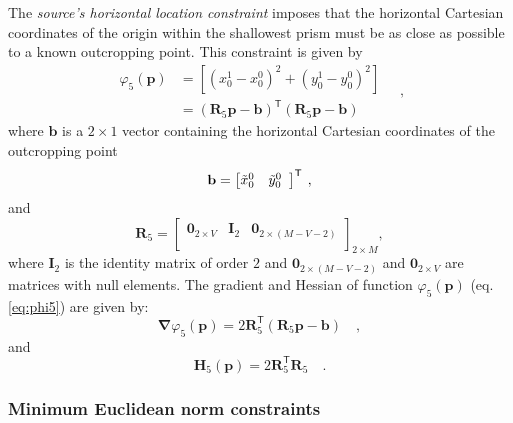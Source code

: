 The \textit{source's horizontal location constraint} imposes that the horizontal Cartesian coordinates of the origin within 
the shallowest prism must be as close as possible to a known outcropping point. This constraint is given by
\begin{equation}\label{eq:phi5}
\begin{split}
\varphi_{5}(\mathbf{p}) &= \left[\left(x_{0}^{1} - x_{0}^{0}\right)^2 + \left(y_{0}^{1} - y_0^0\right)^2\right] \\
&= \left(\mathbf{R}_{5} \mathbf{p} - \mathbf{b} \right)^{\mathsf{T}}
\left(\mathbf{R}_{5} \mathbf{p} - \mathbf{b}\right)
\end{split} \quad ,
\end{equation}
where $\mathbf{b}$ is a $2 \times 1$ vector containing the horizontal Cartesian coordinates of the outcropping point 
\begin{equation}
\mathbf{b} = \left[ \begin{array}{@{}*{12}{c}@{}}
\tilde{x}_{0}^{0} & \tilde{y}_{0}^{0} \\
\end{array} \right]^{\mathsf{T}} \: ,
\label{eq:b-vector}
\end{equation}
and
\begin{equation}
\mathbf{R}_{5} = 
\begin{bmatrix}
\mathbf{0}_{2 \times V} & \mathbf{I}_{2} & \mathbf{0}_{2 \times (M-V-2)} \\
\end{bmatrix}_{2 \times M},
\label{eq:R5-matrix}
\end{equation}
where $\mathbf{I}_{2}$ is the identity matrix of order $2$ and $\mathbf{0}_{2 \times (M-V-2)}$ and 
$\mathbf{0}_{2 \times V}$ are matrices with null elements. The gradient and Hessian of function $\varphi_{5}(\mathbf{p})$ (eq. \ref{eq:phi5}) are given by:
\begin{equation}\label{eq:phi5_grad}
\boldsymbol{\nabla}\varphi_{5}(\mathbf{p}) = 2\mathbf{R}_{5}^{\mathsf{T}}
\left(\mathbf{R}_{5} \mathbf{p} - \mathbf{b}\right) \quad ,
\end{equation}
and
\begin{equation}\label{eq:phi5_hessian}
\mathbf{H}_{5}(\mathbf{p}) = 2 \mathbf{R}^{\mathsf{T}}_{5}\mathbf{R}_{5} \quad .
\end{equation}

\subsubsection{Minimum Euclidean norm constraints}

